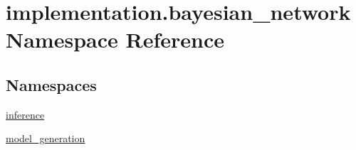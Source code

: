 \hypertarget{namespaceimplementation_1_1bayesian__network}{}\section{implementation.\+bayesian\+\_\+network Namespace Reference}
\label{namespaceimplementation_1_1bayesian__network}
\subsection*{Namespaces}
\begin{DoxyCompactItemize}
\item 
 \hyperlink{namespaceimplementation_1_1bayesian__network_1_1inference}{inference}
\item 
 \hyperlink{namespaceimplementation_1_1bayesian__network_1_1model__generation}{model\+\_\+generation}
\end{DoxyCompactItemize}
